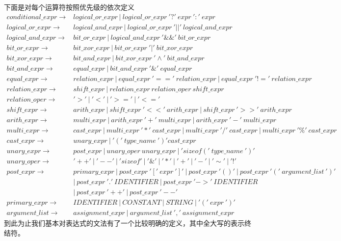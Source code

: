 \documentclass[UTF8]{ctexart}
\begin{document}
下面是对每个运算符按照优先级的依次定义
\begin{align*}
    conditional\_expr\to & logical\_or\_expr\ |\ logical\_or\_expr\ '?'\ expr\ ':'\ expr\\
    logical\_or\_expr\to & logical\_and\_expr\ |\ logical\_or\_expr\ '||'\ logical\_and\_expr\\
    logical\_and\_expr\to & bit\_or\_expr\ |\ logical\_and\_expr\ '\&\&'\ bit\_or\_expr\\
    bit\_or\_expr\to & bit\_xor\_expr\ |\ bit\_or\_expr\ '|'\ bit\_xor\_expr\\
    bit\_xor\_expr\to & bit\_and\_expr\ |\ bit\_xor\_expr\ '\wedge'\ bit\_and\_expr\\
    bit\_and\_expr\to & equal\_expr\ |\ bit\_and\_expr\ '\&'\ equal\_expr\\
    equal\_expr\to & relation\_expr\ |\ equal\_expr\ '=='\ relation\_expr\ |\ equal\_expr\ '!='\ relation\_expr\\
    relation\_expr\to & shift\_expr\ |\ relation\_expr\ relation\_oper\ shift\_expr\\
    relation\_oper\to & '>'\ |\ '<'\ |\ '>='\ |\ '<='\\
    shift\_expr\to & arith\_expr\ |\ shift\_expr\ '<<'\ arith\_expr\ |\ shift\_expr\ '>>'\ arith\_expr\\
    arith\_expr\to & multi\_expr\ |\ arith\_expr\ '+'\ multi\_expr\ |\ arith\_expr\ '-'\ multi\_expr\\
    multi\_expr\to & cast\_expr\ |\ multi\_expr\ '*'\ cast\_expr\ |\ multi\_expr\ '/'\ cast\_expr\ |\ multi\_expr\ '\%'\ cast\_expr\\
    cast\_expr\to & unary\_expr\ |\ '('\ type\_name\ ')' cast\_expr\\
    unary\_expr\to & post\_expr\ |\ unary\_oper\ unary\_expr\ |\ 'sizeof('\ type\_name\ ')'\\
    unary\_oper\to & '++'\ |\ '--'\ |\ 'sizeof'\ |\ '\&'\ |\ '*'\ |\ '+'\ |\ '-'\ |\ '\sim'\ |\ '!'\\
    post\_expr\to & primary\_expr\ |\ post\_expr\ '['\ expr\ ']'\ |\ post\_expr\ '()'\ |\ post\_expr\ '('\ argument\_list\ ')'\\
    & |\ post\_expr\ '.'\ IDENTIFIER\ |\ post\_expr\ '->'\ IDENTIFIER\\
    & |\ post\_expr\ '++'\ |\ post\_expr\ '--'\\
    primary\_expr\to & IDENTIFIER\ |\ CONSTANT\ |\ STRING\ |\ '('\ expr\ ')'\\
    argument\_list\to & assignment\_expr\ |\ argument\_list\ ','\ assignment\_expr
\end{align*}
到此为止我们基本对表达式的文法有了一个比较明确的定义，其中全大写的表示终结符。
\end{document}
